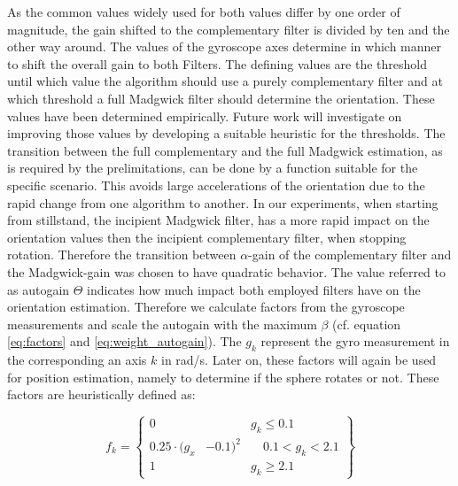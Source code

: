 \documentclass[letterpaper, 10 pt, conference]{ieeeconf}  %
\begin{document}
 As the common values widely used for both values differ by one order of magnitude, the gain shifted to the complementary filter is divided by ten and the other way around.
 The values of the gyroscope axes determine in which manner to shift the overall gain to both Filters. 
 The defining values are the threshold until which value the algorithm should use a purely complementary filter and at which threshold a full Madgwick filter should determine the orientation. 
 These values have been determined empirically.
 Future work will investigate on improving those values by developing a suitable heuristic for the thresholds.
 The transition between the full complementary and the full Madgwick estimation, as is required by the prelimitations,  can be done by a function suitable for the specific scenario.
 This avoids large accelerations of the orientation due to the rapid change from one algorithm to another.
 In our experiments, when starting from stillstand, the incipient Madgwick filter, has a more rapid impact on the orientation values then the incipient complementary filter, when stopping rotation. 
Therefore the transition between $\alpha$-gain of the complementary filter and the Madgwick-gain was chosen to have quadratic behavior. 
The value referred to as autogain $\Theta$ indicates how much impact both employed filters have on the orientation estimation. 
Therefore we calculate factors from the gyroscope measurements and scale the autogain with the maximum $\beta$ (cf. equation \ref{eq:factors} and \ref{eq:weight_autogain}).
The $g_{k}$ represent the gyro measurement in the corresponding an axis $k$ in rad/s. Later on, these factors will again be used for position estimation, namely to determine if the sphere rotates or not.
These factors are heuristically defined as:

\begin{equation}
f_k =
\left\{
\begin{aligned}
0& & g_k \leq 0.1  \\ 
0.25\cdot (g_x&-0.1)^2& \quad 0.1< g_k <2.1 \\
 1& & g_k \geq 2.1
\end{aligned}
\label{eq:factors}
\right\}
\end{equation}
\end{document}
